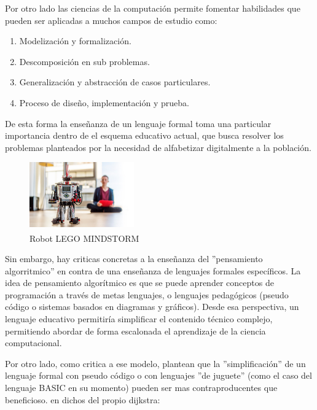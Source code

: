 Por otro lado las ciencias de la computación permite fomentar habilidades que pueden ser aplicadas a muchos campos de estudio como:

\begin{enumerate}
  \item Modelización y formalización.
  \item Descomposición en sub problemas.
  \item Generalización y abstracción de casos particulares.
  \item Proceso de diseño, implementación y prueba.
\end{enumerate}

De esta forma la enseñanza de un lenguaje formal toma una particular importancia dentro de el esquema educativo actual, que busca resolver los problemas planteados por la necesidad de alfabetizar digitalmente a la población.

 
 \begin{figure}
  \begin{center}
    \includegraphics[width=0.4\textwidth]{figuras/lego_mindstorm.jpg}
    \caption[Caption for LOF]{Robot LEGO\textsuperscript{\textregistered} MINDSTORM\textsuperscript{\textregistered}}
       
    \label{fig:legomindstorm }
  \end{center}
\end{figure}

Sin embargo, hay criticas concretas a la enseñanza del ''pensamiento algorritmico'' en contra de una enseñanza de lenguajes formales específicos. La idea de pensamiento algorítmico es que se puede aprender conceptos de programación a través de metas lenguajes, o lenguajes pedagógicos (pseudo código o sistemas basados en diagramas y gráficos). Desde esa perspectiva, un lenguaje educativo permitiría simplificar el contenido técnico complejo, permitiendo abordar de forma escalonada el aprendizaje de la ciencia computacional.

Por otro lado, como critica a ese modelo, \cite{dijkstra2010que} plantean que la ''simplificación'' de un lenguaje formal con pseudo código o con lenguajes ''de juguete'' (como el caso del lenguaje BASIC en su momento) pueden ser mas  contraproducentes que beneficioso. en dichos del propio dijkstra:

